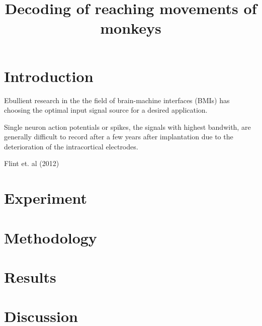 \documentclass{article}
\begin{document}
\title{Decoding of reaching movements of monkeys}
\maketitle


\section*{Introduction}

Ebullient research in the the field of brain-machine interfaces (BMIs) has 
choosing the optimal input signal source for a desired application.  

Single neuron action potentials or spikes, the signals with highest bandwith, are generally difficult to record after a few years after implantation due to the deterioration of the intracortical electrodes.  




Flint et. al (2012) 



\section*{Experiment}


\section*{Methodology}


\section*{Results}

\section*{Discussion}
\end{document}
